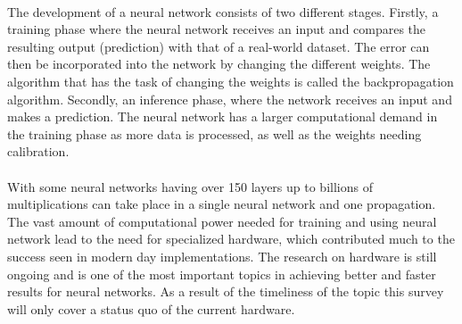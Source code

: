 \documentclass[conference]{IEEEtran}
\begin{document}
	\\
	The development of a neural network consists of two different stages. Firstly, a training phase where the neural network receives an input and compares the resulting output (prediction) with that of a real-world dataset. The error can then be incorporated into the network by changing the different weights. The algorithm that has the task of changing the weights is called the backpropagation algorithm. Secondly, an inference phase, where the network receives an input and makes a prediction. The neural network has a larger computational demand in the training phase as more data is processed, as well as the weights needing calibration.
	\\
	\\
	With some neural networks having over 150 layers \cite{densely_network} up to billions of multiplications can take place in a single neural network and one propagation. The vast amount of computational power needed for training and using neural network lead to the need for specialized hardware, which contributed much to the success seen in modern day implementations. The research on hardware is still ongoing and is one of the most important topics in achieving better and faster results for neural networks. As a result of the timeliness of the topic this survey will only cover a status quo of the current hardware.
	\\
	
\end{document}
